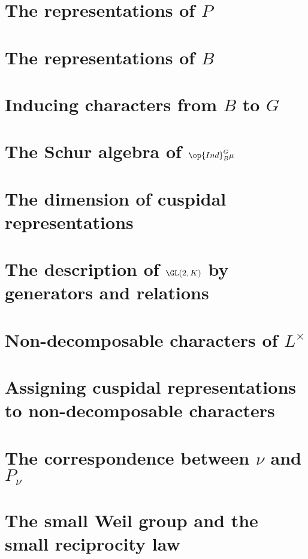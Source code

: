 \documentclass[../main.tex]{subfiles}
\begin{document}
\section{The representations of \texorpdfstring{$P$}{ P}}

\section{The representations of \texorpdfstring{$B$}{ B}}

\section{Inducing characters from \texorpdfstring{$B$}{ B} to \texorpdfstring{$G$}{ G}}

\section{The Schur algebra of \texorpdfstring{$\op{Ind}^G_B\mu$}{ Ind mu}}

\section{The dimension of cuspidal representations}

\section{The description of \texorpdfstring{$\GL(2,K)$}{ GL(2,K)} by generators and relations}

\section{Non-decomposable characters of \texorpdfstring{$L^\times$}{ L*}}

\section{Assigning cuspidal representations to non-decomposable characters}

\section{The correspondence between \texorpdfstring{$\nu$}{ v} and \texorpdfstring{$P_\nu$}{ Pv}}

\section{The small Weil group and the small reciprocity law}
\end{document}
